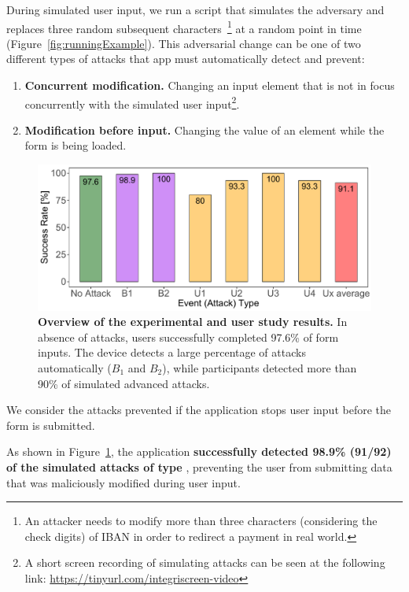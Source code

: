 During simulated user input, we run a script that simulates the adversary and replaces three random subsequent characters~\footnote{An attacker needs to modify more than three characters (considering the check digits) of IBAN in order to redirect a payment in real world.} at a random point in time (Figure~\ref{fig:runningExample}).
This adversarial change can be one of two different types of attacks that \sysname app must automatically detect and prevent:
\begin{enumerate}[leftmargin=*]
	\item[\B{1}] \textbf{Concurrent modification.} Changing an input element that is not in focus concurrently with the simulated user input\footnote{
A short screen recording of simulating  attacks can be seen at the following link:
\url{https://tinyurl.com/integriscreen-video}}.
\item[\B{2}] \textbf{Modification before input.} Changing the value of an element while the form is being loaded.
\end{enumerate}


\begin{figure}[t]
	\centering
	\hspace*{-10mm}
	\includegraphics[width=1\columnwidth]{img/successRates.pdf}
	\caption{
		\textbf{Overview of the experimental and user study results.}
        In absence of attacks, users successfully completed 97.6\% of form inputs.
        The device detects a large percentage of attacks automatically ($B_1$ and $B_2$), while participants detected more than 90\% of simulated advanced attacks.
	} \label{fig:resultsOverview}
\end{figure}


We consider the attacks prevented if the application stops user input before the form is submitted.


As shown in Figure~\ref{fig:resultsOverview}, the application \textbf{successfully detected 98.9\% (91/92) of the simulated attacks of type }, preventing the user from submitting data that was maliciously modified during user input.

